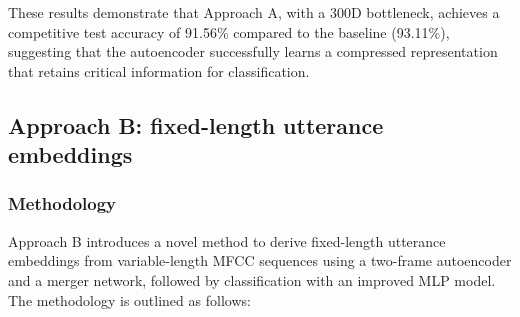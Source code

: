 \documentclass[12pt]{article}
\begin{document}
These results demonstrate that Approach A, with a 300D bottleneck, achieves a competitive test accuracy of 91.56\% compared to the baseline (93.11\%), suggesting that the autoencoder successfully learns a compressed representation that retains critical information for classification.

\subsection{Approach B: fixed-length utterance embeddings}
\subsubsection{Methodology}

Approach B introduces a novel method to derive fixed-length utterance embeddings from variable-length MFCC sequences using a two-frame autoencoder and a merger network, followed by classification with an improved MLP model. The methodology is outlined as follows:
\end{document}
